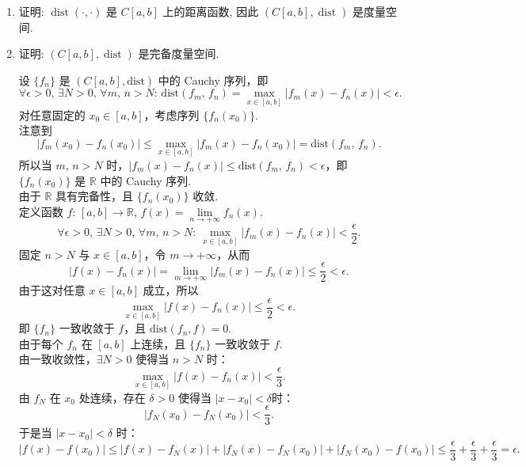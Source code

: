 \begin{enumerate}
    \item[1.]证明: $\displaystyle\operatorname {dist}(\cdot , \cdot)$ 是 $C[a, b]$ 上的距离函数, 因此 $\displaystyle(C[a, b], \operatorname {dist})$ 是度量空间.
    \item[2.]证明: $\displaystyle(C[a, b], \operatorname {dist})$ 是完备度量空间.
    \begin{solution}
        设 $\{f_{n}\}$ 是 $(C[a,b],\mathrm{dist})$ 中的 Cauchy 序列，即
        \[
        \forall \epsilon>0,\,\exists N>0,\,\forall m,\,n>N:\,\mathrm{dist}(f_{m},\,f_{n})=\max_{x\in[a,b]}\left|f_{m}(x)-f_{n}(x)\right|<\epsilon.
        \]
        对任意固定的 $x_{0}\in [a,b]$，考虑序列 $\{f_{n}(x_{0})\}$.\\
        注意到
        \[
        \left|f_{m}(x_{0})-f_{n}(x_{0})\right|\leq \max_{x\in[a,b]}\left|f_{m}(x)-f_{n}(x_{0})\right|=\mathrm{dist}(f_{m},\,f_{n}).
        \]
        所以当 $m,\,n>N$ 时，$\left|f_{m}(x)-f_{n}(x)\right|\leq \mathrm{dist}(f_{m},\,f_{n})<\epsilon$，即 $\{f_{n}(x_{0})\}$ 是 $\mathbb{R}$ 中的 Cauchy 序列.\\
        由于 $\mathbb{R}$ 具有完备性，且 $\{f_{n}(x_{0})\}$ 收敛.\\
        定义函数 $f:\,[a,b]\to \mathbb{R},\,f(x)=\underset{n\to+\infty}{\lim}f_{n}(x)$.\\
        \[
        \forall \epsilon>0,\,\exists N>0,\,\forall m,\,n>N:\,\max_{x\in[a,b]}\left|f_{m}(x)-f_{n}(x)\right|<\frac{\epsilon}{2}.
        \]
        固定 $n>N$ 与 $x\in[a,b]$，令 $m\to+\infty$，从而
        \[
        \left|f(x)-f_{n}(x)\right|=\lim_{m\to+\infty}\left|f_{m}(x)-f_{n}(x)\right|\leq \frac{\epsilon}{2}<\epsilon.
        \]
        由于这对任意 $x\in[a,b]$ 成立，所以
        \[
        \max_{x\in[a,b]}\left|f(x)-f_{n}(x)\right|\leq \frac{\epsilon}{2}<\epsilon.
        \]
        即 $\{f_{n}\}$ 一致收敛于 $f$，且 $\mathrm{dist}(f_{n},f)=0$.\\
        由于每个 $f_{n}$ 在 $[a,b]$ 上连续，且 $\{f_{n}\}$ 一致收敛于 $f$.\\
        由一致收敛性，$\exists N>0$ 使得当 $n>N$ 时：
        \[
        \max_{x\in[a,b]}\left|f(x)-f_{n}(x)\right|<\frac{\epsilon}{3}.
        \]
        由 $f_{N}$ 在 $x_{0}$ 处连续，存在 $\delta>0$ 使得当 $\left|x-x_{0}\right|<\delta$时：
        \[
        \left|f_{N}(x_{0})-f_{N}(x_{0})\right|<\frac{\epsilon}{3}.
        \]
        于是当 $\left|x-x_{0}\right|<\delta$ 时：
        \[
        \left|f(x)-f(x_{0})\right|\leq \left|f(x)-f_{N}(x)\right|+\left|f_{N}(x)-f_{N}(x_{0})\right|+\left|f_{N}(x_{0})-f(x_{0})\right|\leq \frac{\epsilon}{3}+\frac{\epsilon}{3}+\frac{\epsilon}{3}=\epsilon.
\]
\end{solution}
\end{enumerate}

